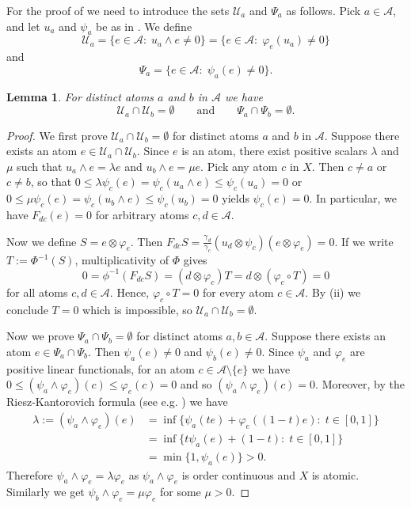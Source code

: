 \documentclass[12pt,reqno]{amsart}
\theoremstyle{plain}
\newtheorem{lemma}[theorem]{Lemma}
\theoremstyle{definition}
\renewcommand{\le}{\leqslant}
\begin{document}
For the proof of  we need to introduce the sets $\mathcal U_a$ and $\Psi_a$ as follows. 
Pick $a\in \mathcal A$,  and let $u_a$ and $\psi_a$ be as in . We define
$${\mathcal U}_a=\{e\in \mathcal A:\; u_a\wedge e\ne 0\}=\{e\in \mathcal A:\; \varphi_e(u_a)\ne 0\}$$
and
$${\Psi}_a=\{e\in \mathcal A:\; \psi_a(e)\ne 0\}.$$

\begin{lemma}\label{o ua in psia}
For distinct atoms $a$ and $b$ in $\mathcal A$ we have 
$$\mathcal U_a \cap \mathcal U_b=\emptyset \qquad \textrm{and}\qquad \Psi_a\cap \Psi_b=\emptyset.$$
\end{lemma}

\begin{proof}
We first prove $\mathcal U_a\cap \mathcal U_b=\emptyset$ for distinct atoms $a$ and $b$ in $\mathcal A$. 
Suppose there exists an atom $e\in \mathcal U_a\cap \mathcal U_b$. 
Since $e$ is an atom, there exist positive scalars $\lambda$ and $\mu$ such that $u_a\wedge e=\lambda e$ and $u_b\wedge e=\mu e$.
Pick any atom $c$ in $X$. Then $c\neq a$ or $c\neq b$, so that $0\leq \lambda \psi_c(e)=\psi_c(u_a\wedge e)\leq \psi_c(u_a)=0$ or $0 \leq \mu \psi_c(e)=\psi_c(u_b\wedge e)\leq \psi_c(u_b)=0$ yields $\psi_c(e)=0$. In particular, we have $F_{dc}(e)=0$ for arbitrary atoms $c,d\in \mathcal A$.

Now we define $S=e\otimes \varphi_e$. Then $F_{dc}S=\frac{\gamma_d}{\gamma_c}(u_d\otimes \psi_c)(e\otimes \varphi_e)=0$. If we write $T:=\Phi^{-1}(S)$, multiplicativity of $\Phi$ gives 
$$0=\phi^{-1}(F_{dc}S)=(d\otimes \varphi_c) T=d\otimes (\varphi_c\circ T)=0$$ 
for all atoms $c, d\in \mathcal A$. Hence, $\varphi_c\circ T=0$ for every atom $c\in \mathcal A$. By (ii) we conclude $T=0$ which is impossible, so $\mathcal U_a\cap \mathcal U_b=\emptyset$.

Now we prove $\Psi_a\cap \Psi_b=\emptyset$ for distinct atoms $a,b\in \mathcal A$. Suppose there exists an atom $e\in \Psi_a\cap \Psi_b$. 
Then $\psi_a(e)\ne 0$ and $\psi_b(e)\ne 0$. Since $\psi_a$ and $\varphi_e$ are positive linear functionals, for an atom
$c\in\mathcal A\setminus\{e\}$ we have $0\leq (\psi_a\wedge\varphi_e)(c)\le \varphi_e(c)=0$ and so $(\psi_a\wedge\varphi_e)(c)=0$. Moreover, by the Riesz-Kantorovich formula (see e.g. \cite[Theorem 1.18]{Aliprantis:06}) we have
\begin{align*}
 \lambda := (\psi_a\wedge\varphi_e)(e)&=\inf\{\psi_a(te)+\varphi_e((1-t)e):\; t\in[0,1]\}\\
 &=\inf\{t\psi_a(e)+(1-t):\; t\in[0,1]\}\\
 &=\min\{1, \psi_a(e)\}>0.   
\end{align*}
Therefore $\psi_a\wedge\varphi_e=\lambda\varphi_e$ as $\psi_a\wedge\varphi_e$ is order continuous and $X$ is atomic. Similarly we get $\psi_b\wedge\varphi_e=\mu\varphi_e$ for some $\mu>0$.


\end{proof}
\end{document}
